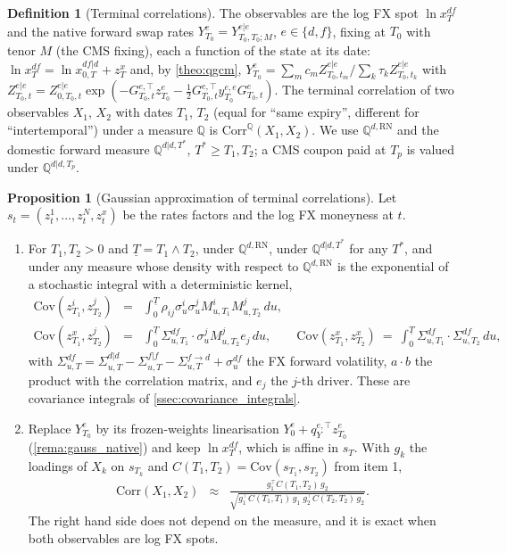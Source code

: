 \documentclass[11pt,english]{amsart}
\newcommand{\RN}{\mathrm{RN}}
\newcommand{\QQ}{\mathbb{Q}}
\newcommand{\Cov}{\mathrm{Cov}}
\theoremstyle{definition}
\newtheorem{prop}{Proposition}
\newtheorem{defi}{Definition}
\begin{document}
\begin{defi}[Terminal correlations]\label{defi:lgcm_terminal_correlation}
The observables are the log FX spot $\ln x^{df}_T$ and the native forward swap rates $Y^{e}_{T_0} = Y^{e|e}_{T_0,T_0;M}$, $e\in\{d,f\}$, fixing at $T_0$ with tenor $M$ (the CMS fixing), each a function of the state at its date: $\ln x^{df}_T = \ln x^{df|d}_{0,T} + z^x_T$ and, by \autoref{theo:qgcm}, $Y^e_{T_0} = \sum_m c_m Z^{e|e}_{T_0,t_m}/\sum_k \tau_k Z^{e|e}_{T_0,t_k}$ with $Z^{e|e}_{T_0,t} = Z^{e|e}_{0,T_0,t}\exp(-G^{e,\top}_{T_0,t}z^e_{T_0} - \frac12G^{e,\top}_{T_0,t}y^{e,e}_{T_0}G^e_{T_0,t})$. The terminal correlation of two observables $X_1$, $X_2$ with dates $T_1$, $T_2$ (equal for ``same expiry'', different for ``intertemporal'') under a measure $\QQ$ is $\mathrm{Corr}^{\QQ}(X_1,X_2)$. We use $\QQ^{d,\RN}$ and the domestic forward measure $\QQ^{d|d,T^*}$, $T^*\ge T_1,T_2$; a CMS coupon paid at $T_p$ is valued under $\QQ^{d|d,T_p}$.
\end{defi}

\begin{prop}[Gaussian approximation of terminal correlations]\label{prop:lgcm_corr_approx}
Let $s_t = (z^{1}_t,\ldots,z^{N}_t, z^x_t)$ be the rates factors and the log FX moneyness at $t$.
\begin{enumerate}
\item For $T_1, T_2 > 0$ and $\underline{T} = T_1\wedge T_2$, under $\QQ^{d,\RN}$, under $\QQ^{d|d,T^*}$ for any $T^*$, and under any measure whose density with respect to $\QQ^{d,\RN}$ is the exponential of a stochastic integral with a deterministic kernel,
\begin{eqnarray*}
  \Cov(z^i_{T_1},z^j_{T_2}) &=& \int_0^{\underline{T}} \rho_{ij}\sigma^i_u\sigma^j_u M^i_{u,T_1}M^j_{u,T_2}\,du , \\
  \Cov(z^x_{T_1},z^j_{T_2}) &=& \int_0^{\underline{T}} \Sigma^{df}_{u,T_1}\cdot \sigma^j_u M^j_{u,T_2} e_j\,du , \qquad
  \Cov(z^x_{T_1},z^x_{T_2}) ~=~ \int_0^{\underline{T}} \Sigma^{df}_{u,T_1}\cdot\Sigma^{df}_{u,T_2}\,du ,
\end{eqnarray*}
with $\Sigma^{df}_{u,T} = \Sigma^{d|d}_{u,T} - \Sigma^{f|f}_{u,T} - \Sigma^{f\to d}_{u,T} + \sigma^{df}_u$ the FX forward volatility, $a\cdot b$ the product with the correlation matrix, and $e_j$ the $j$-th driver. These are covariance integrals of \autoref{ssec:covariance_integrals}.
\item Replace $Y^e_{T_0}$ by its frozen-weights linearisation $Y^e_0 + q^{e,\top}_Y z^e_{T_0}$ (\autoref{rema:gauss_native}) and keep $\ln x^{df}_T$, which is affine in $s_T$. With $g_k$ the loadings of $X_k$ on $s_{T_k}$ and $C(T_1,T_2) = \Cov(s_{T_1},s_{T_2})$ from item 1,
\begin{eqnarray}
  \mathrm{Corr}(X_1,X_2) &\approx& \frac{g_1^\top C(T_1,T_2)\,g_2}{\sqrt{g_1^\top C(T_1,T_1)\,g_1\;g_2^\top C(T_2,T_2)\,g_2}} .
  \label{eq:lgcm_corr_approx}
\end{eqnarray}
The right hand side does not depend on the measure, and it is exact when both observables are log FX spots.
\end{enumerate}
\end{prop}
\end{document}
